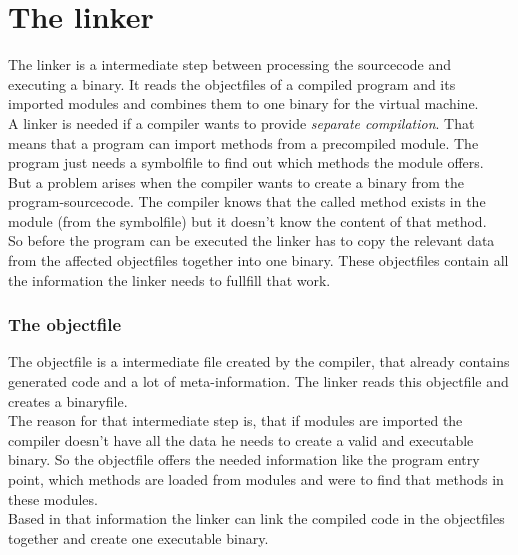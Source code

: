 \part{The linker}
The linker is a intermediate step between processing the sourcecode and executing a
binary. It reads the objectfiles of a compiled program and its imported
modules and combines them to one binary for the virtual machine.
\\
A linker is needed if a compiler wants to provide \emph{separate compilation}.
That means that a program can import methods from a precompiled module. The
program just needs a symbolfile to find out which methods the module offers. \\
But a problem arises when the compiler wants to create a binary from the
program-sourcecode. The compiler knows that the called method exists in the
module (from the symbolfile) but it doesn't know the content of that method. \\
So before the program can be executed the linker has to copy the relevant data
from the affected objectfiles together into one binary. These objectfiles contain
all the information the linker needs to fullfill that work.    

\section{The objectfile}
\label{objectfile}
The objectfile is a intermediate file created by the compiler, that already
contains generated code and a lot of meta-information. The linker reads this
objectfile and creates a binaryfile. \\
The reason for that intermediate step is, that if modules are imported the
compiler doesn't have all the data he needs to create a valid and executable binary. 
So the objectfile offers the needed information like the program entry point, which
methods are loaded from modules and were to find that methods in these modules. \\
Based in that information the linker can link the compiled code in the
objectfiles together and create one executable binary.

